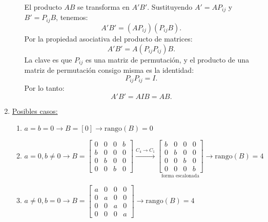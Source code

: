 \begin{enumerate}[label=\color{red}\textbf{\arabic*)}]
\begin{enumerate}[label=Paso \arabic*:]
                El producto $AB$ se transforma en $A'B'$. Sustituyendo  $A'=AP_{ij}$ y $B'=P_{ij}B$, tenemos: \[
                A'B'=(AP_{ij})(P_{ij}B).
                \] 
                Por la propiedad asociativa del producto de matrices: \[
                    A'B'=A(P_{ij}P_{ij})B.
                \] 
                La clave es que $P_{ij}$ es una matriz de permutación, y el producto de una matriz de permutación consigo misma es la identidad: \[
                P_{ij}P_{ij}=I.
                \] 
                Por lo tanto: \[
                A'B'=AIB=AB.
                \] 
        \end{enumerate}
    \item {}

    \underline{Posibles casos:}
    \begin{enumerate}[label=\arabic*)]
        \item $a=b=0\longrightarrow B=[0]\longrightarrow \mathrm{rango}(B)=0$ 
        \item $a=0,b\neq 0\longrightarrow B=\begin{bmatrix} 
                0 & 0 & 0 & b\\
                b & 0 & 0 & 0\\
                0 & b & 0 & 0\\
                0 & 0 & b & 0
                \end{bmatrix}\xrightarrow{C_4\to C_1}\underset{\text{forma escalonada}}{\begin{bmatrix} 
                b & 0 & 0 & 0\\
                0 & b & 0 & 0\\
                0 & 0 & b & 0\\
                0 & 0 & 0 & b
        \end{bmatrix}}\longrightarrow \mathrm{rango}(B)=4  $ 
        \item $a\neq 0,b=0\longrightarrow B=\begin{bmatrix} 
                a & 0 & 0 & 0\\
                0 & a & 0 & 0\\
                0 & 0 & a & 0\\
                0 & 0 & 0 & a
        \end{bmatrix}\longrightarrow \mathrm{rango}(B)=4 $
    \end{enumerate}


\end{enumerate}
